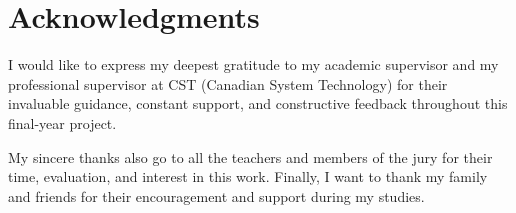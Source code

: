 \chapter*{Acknowledgments}

I would like to express my deepest gratitude to my academic supervisor and my professional supervisor at CST (Canadian System Technology) for their invaluable guidance, constant support, and constructive feedback throughout this final-year project.

My sincere thanks also go to all the teachers and members of the jury for their time, evaluation, and interest in this work. Finally, I want to thank my family and friends for their encouragement and support during my studies.
